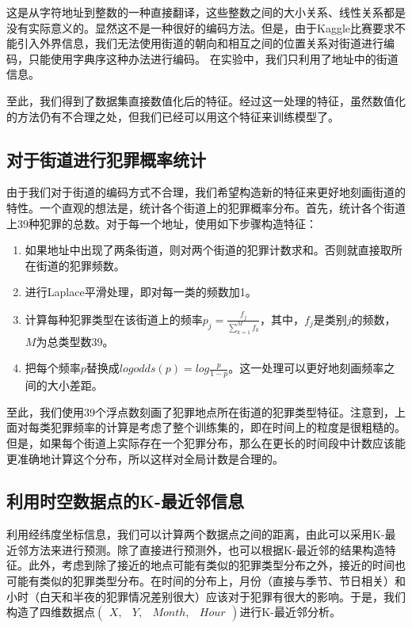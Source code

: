这是从字符地址到整数的一种直接翻译，这些整数之间的大小关系、线性关系都是没有实际意义的。显然这不是一种很好的编码方法。但是，由于Kaggle比赛要求不能引入外界信息，我们无法使用街道的朝向和相互之间的位置关系对街道进行编码，只能使用字典序这种办法进行编码。
在实验中，我们只利用了地址中的街道信息。

至此，我们得到了数据集直接数值化后的特征。经过这一处理的特征，虽然数值化的方法仍有不合理之处，但我们已经可以用这个特征来训练模型了。


\subsection{对于街道进行犯罪概率统计}

由于我们对于街道的编码方式不合理，我们希望构造新的特征来更好地刻画街道的特性。一个直观的想法是，统计各个街道上的犯罪概率分布。首先，统计各个街道上39种犯罪的总数。对于每一个地址，使用如下步骤构造特征：

\begin{enumerate}
    \item 如果地址中出现了两条街道，则对两个街道的犯罪计数求和。否则就直接取所在街道的犯罪频数。
    \item 进行Laplace平滑处理，即对每一类的频数加1。
    \item 计算每种犯罪类型在该街道上的频率$p_j = \frac{f_j} {\sum_{k=1}^M f_k}$，其中，$f_j$是类别$j$的频数，$M$为总类型数39。
    \item 把每个频率$p$替换成$logodds(p)=log\frac{p}{1-p}$。这一处理可以更好地刻画频率之间的大小差距。
\end{enumerate}

至此，我们使用39个浮点数刻画了犯罪地点所在街道的犯罪类型特征。注意到，上面对每类犯罪频率的计算是考虑了整个训练集的，即在时间上的粒度是很粗糙的。但是，如果每个街道上实际存在一个犯罪分布，那么在更长的时间段中计数应该能更准确地计算这个分布，所以这样对全局计数是合理的。

\subsection{利用时空数据点的K-最近邻信息}

利用经纬度坐标信息，我们可以计算两个数据点之间的距离，由此可以采用K-最近邻方法来进行预测。除了直接进行预测外，也可以根据K-最近邻的结果构造特征。此外，考虑到除了接近的地点可能有类似的犯罪类型分布之外，接近的时间也可能有类似的犯罪类型分布。在时间的分布上，月份（直接与季节、节日相关）和小时（白天和半夜的犯罪情况差别很大）应该对于犯罪有很大的影响。于是，我们构造了四维数据点$(\begin{array}{cccc}X, & Y, & Month, & Hour\end{array})$进行K-最近邻分析。

